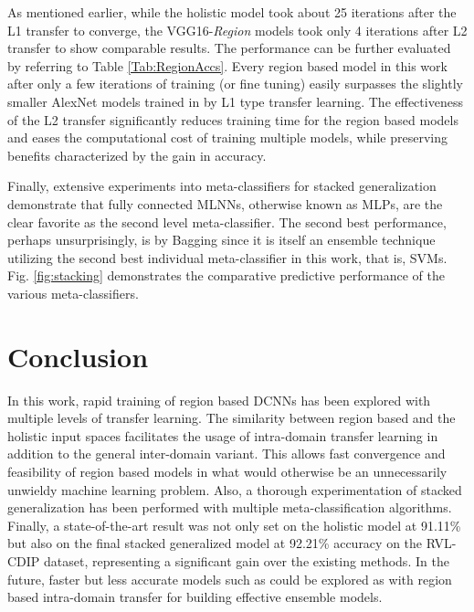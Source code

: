 \documentclass[10pt,conference,a4paper]{IEEEtran}
\begin{document}
As mentioned earlier, while the holistic model took about 25 iterations after the L1 transfer to converge, the VGG16-\textit{Region} models took only 4 iterations after L2 transfer to show comparable results. The performance can be further evaluated by referring to Table \ref{Tab:RegionAccs}. Every region based model in this work after only a few iterations of training (or fine tuning) easily surpasses the slightly smaller AlexNet models trained in \cite{harley2015evaluation} by L1 type transfer learning. The effectiveness of the L2 transfer significantly reduces training time for the region based models and eases the computational cost of training multiple models, while preserving benefits characterized by the gain in accuracy.


Finally, extensive experiments into meta-classifiers for stacked generalization demonstrate that fully connected MLNNs, otherwise known as MLPs, are the clear favorite as the second level meta-classifier. The second best performance, perhaps unsurprisingly, is by Bagging since it is itself an ensemble technique utilizing the second best individual meta-classifier in this work, that is, SVMs. Fig. \ref{fig:stacking} demonstrates the comparative predictive performance of the various meta-classifiers.




\section{Conclusion}
In this work, rapid training of region based DCNNs has been explored with multiple levels of transfer learning. The similarity between region based and the holistic input spaces facilitates the usage of intra-domain transfer learning in addition to the general inter-domain variant. This allows fast convergence and feasibility of region based models in what would otherwise be an unnecessarily unwieldy machine learning problem. Also, a thorough experimentation of stacked generalization has been performed with multiple meta-classification algorithms. Finally, a state-of-the-art result was not only set on the holistic model at 91.11\% but also on the final stacked generalized model at 92.21\% accuracy on the RVL-CDIP dataset, representing a significant gain over the existing methods. In the future, faster but less accurate models such as \cite{afzal2017cutting} could be explored as with region based intra-domain transfer for building effective ensemble models.




\end{document}
